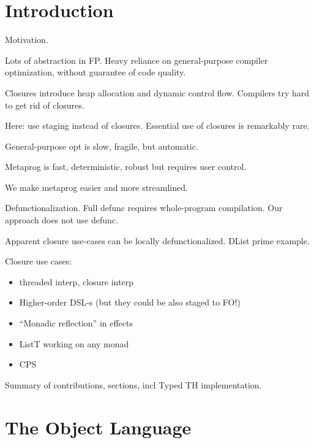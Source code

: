\documentclass[acmsmall,screen,review,anonymous]{acmart}
\theoremstyle{remark}
\begin{document}


\maketitle


\section{Introduction}\label{sec:introduction}


Motivation.

Lots of abstraction in FP. Heavy reliance on general-purpose compiler
optimization, without guarantee of code quality.

Closures introduce heap allocation and dynamic control flow. Compilers
try hard to get rid of closures.

Here: use staging instead of closures. Essential use of closures is
remarkably rare.

General-purpose opt is slow, fragile, but automatic.

Metaprog is fast, deterministic, robust but requires user control.

We make metaprog easier and more streamlined.

Defunctionalization. Full defunc requires whole-program compilation.
Our approach does not use defunc.

Apparent closure use-cases can be locally defunctionalized. DList prime example.

Closure use cases:
\begin{itemize}
\item threaded interp, closure interp
\item Higher-order DSL-s (but they could be also staged to FO!)
\item ``Monadic reflection'' in effects
\item ListT working on any monad
\item CPS
\end{itemize}

Summary of contributions, sections, incl Typed TH implementation.

\section{The Object Language}\label{sec:the-object-language}
\end{document}

